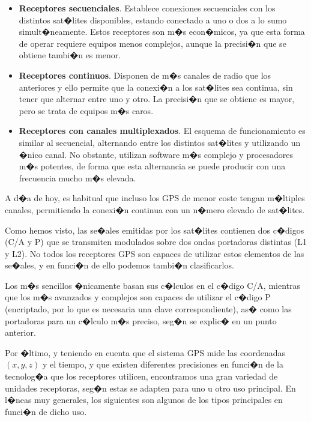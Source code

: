\begin{itemize}
	\item \textbf{Receptores secuenciales}. Establece conexiones secuenciales con los distintos sat�lites disponibles, estando conectado a uno o dos a lo sumo simult�neamente. Estos receptores son m�s econ�micos, ya que esta forma de operar requiere equipos menos complejos, aunque la precisi�n que se obtiene tambi�n es menor.
	\item \textbf{Receptores continuos}. Disponen de m�s canales de radio que los anteriores y ello permite que la conexi�n a los sat�lites sea continua, sin tener que alternar entre uno y otro. La precisi�n que se obtiene es mayor, pero se trata de equipos m�s caros.
	\item \textbf{Receptores con canales multiplexados}. El esquema de funcionamiento es similar al secuencial, alternando entre los distintos sat�lites y utilizando un �nico canal. No obstante, utilizan software m�s complejo y procesadores m�s potentes, de forma que esta alternancia se puede producir con una frecuencia mucho m�s elevada. 
\end{itemize}


A d�a de hoy, es habitual que incluso los GPS de menor coste tengan m�ltiples canales, permitiendo la conexi�n continua con un n�mero elevado de sat�lites.

Como hemos visto, las se�ales emitidas por los sat�lites contienen dos c�digos (C/A y P) que se transmiten modulados sobre dos ondas portadoras distintas (L1 y L2). No todos los receptores GPS son capaces de utilizar estos elementos de las se�ales, y en funci�n de ello podemos tambi�n clasificarlos. 

Los m�s sencillos �nicamente basan sus c�lculos en el c�digo C/A, mientras que los m�s avanzados y complejos son capaces de utilizar el c�digo P (encriptado, por lo que es necesaria una clave correspondiente), as� como las portadoras para un c�lculo m�s preciso, seg�n se explic� en un punto anterior.

Por �ltimo, y teniendo en cuenta que el sistema GPS mide las coordenadas $(x,y,z)$ y el tiempo, y que existen diferentes precisiones en funci�n de la tecnolog�a que los receptores utilicen, encontramos una gran variedad de unidades receptoras, seg�n estas se adapten para uno u otro uso principal. En l�neas muy generales, los siguientes son algunos de los tipos principales en funci�n de dicho uso.

